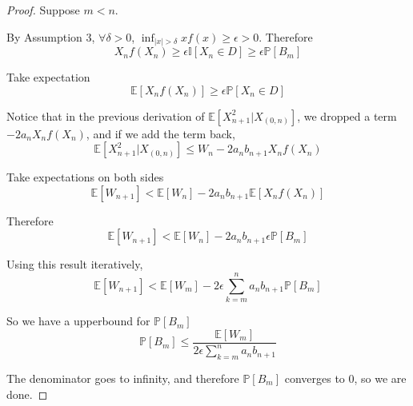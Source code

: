 \begin{proof}
        Suppose $m < n$.

        By Assumption 3, $\forall \delta > 0$, $\inf_{|x|>\delta} xf(x) \ge \epsilon > 0$. Therefore
        \[ X_nf(X_n) \ge \epsilon\mathbb{I}[X_n \in D] \ge \epsilon\mathbb{P}[B_m] \]

        Take expectation
        \[ \mathbb{E}[X_nf(X_n)] \ge \epsilon\mathbb{P}[X_n \in D] \]

        Notice that in the previous derivation of $\mathbb{E}[X_{n+1}^2|X_{(0,n)}]$, we dropped a term $- 2a_nX_nf(X_n)$, and if we add the term back,
        \[ \mathbb{E}[X_{n+1}^2|X_{(0,n)}] \le W_n - 2a_nb_{n+1}X_nf(X_n) \]

        Take expectations on both sides
        \[ \mathbb{E}[W_{n+1}] < \mathbb{E}[W_n] - 2a_nb_{n+1}\mathbb{E}[X_nf(X_n)] \]

        Therefore
        \[ \mathbb{E}[W_{n+1}] < \mathbb{E}[W_n] -2a_nb_{n+1}\epsilon\mathbb{P}[B_m] \]

        Using this result iteratively,
        \[ \mathbb{E}[W_{n+1}] < \mathbb{E}[W_m] - 2\epsilon\sum_{k=m}^n a_nb_{n+1}\mathbb{P}[B_m] \]

        So we have a upperbound for $\mathbb{P}[B_m]$
        \[ \mathbb{P}[B_m] \le \frac{\mathbb{E}[W_m]}{2\epsilon\sum_{k=m}^na_nb_{n+1}} \]

        The denominator goes to infinity, and therefore $\mathbb{P}[B_m]$ converges to 0, so we are done.
    \end{proof}